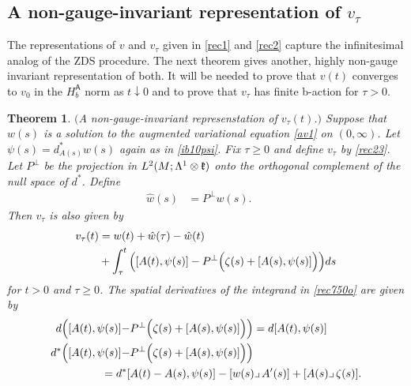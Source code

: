 \documentclass[12pt]{article}
\newtheorem{theorem}{Theorem}[section]
\def \L{\Lambda}
\def \({\Big(}
\def \){\Big)}
\def \As{\mathsf{A}}
\def \kf{\frak k}
\def \eref{\eqref}
\def \lrc{\lrcorner\,}
\numberwithin{equation}{section}
\begin{document}
\subsection{A non-gauge-invariant representation of $v_\tau$}

 The representations of $v$ and $v_\tau$ given in \eref{rec1} and \eref{rec2} 
   capture    the infinitesimal analog of the ZDS procedure. 
The next theorem  gives another, highly non-gauge invariant
 representation of both. It will be needed to prove that 
 $v(t)$ converges to $v_0$ in the $H_b^\As$ norm as $t\downarrow 0$ and to prove that 
 $v_\tau$ has finite b-action for $\tau>0$. 
 

\begin{theorem} \label{thmrec5b}  
 $($A non-gauge-invariant represenstation of $v_\tau(t)$.$)$
Suppose that $w(s)$ is a solution to the augmented variational equation \eref{av1} on $(0,\infty)$.
Let $\psi(s) = d_{A(s)}^* w(s)$ again  as in \eref{ib10psi}. 
Fix $\tau \ge 0$ and define  $v_\tau$  by \eref{rec23}.
Let $P^\perp$ be the projection in $L^2(M; \L^1 \otimes \kf)$ onto the 
orthogonal complement of the null space of $d^*$.
Define
 \begin{align}
 \hat w(s) &= P^\perp w(s).\ \ \ \ \ \         \label{rec751.0}
\end{align}
Then $v_\tau$ is also given by 
      \begin{align}
v_\tau(t) &=w(t) +  \hat w(\tau) - \hat w(t)    \notag \\
  &+\int_\tau^t\Big( [A(t), \psi(s)] - P^\perp\(\zeta(s) + [A(s), \psi(s)]\)\) ds  \label{rec750o}                        
  \end{align}
  for $t >0$ and $\tau \ge 0$.
  The spatial derivatives 
 of the integrand  in \eref{rec750o} are given by
 \begin{align}
 d \Big( [A(t), \psi(s)] - &P^\perp\(\zeta(s) + [A(s), \psi(s)]\) \) = d[A(t), \psi(s)]      \label{rec756}\\
 d^* \Big( [A(t), \psi(s)] - & P^\perp\(\zeta(s) + [A(s), \psi(s)]\)\)  \notag\\
 = d^*[&A(t) - A(s), \psi(s)]    - [w(s)\lrc A'(s)]  +[ A(s)\lrc  \zeta(s) ].          \label{rec757o}     
 \end{align}
\end{theorem} 
\end{document}
